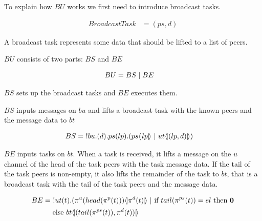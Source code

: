 To explain how $BU$ works we first need to introduce broadcast tasks.

\begin{align*}
    BroadcastTask &= (ps, d)
\end{align*}

A broadcast task represents some data that should be lifted to a list of peers.

$BU$ consists of two parts: $BS$ and $BE$

\begin{align*}
    BU &= BS \mid BE
\end{align*}

$BS$ sets up the broadcast tasks and $BE$ executes them.

$BS$ inputs messages on $bu$ and lifts a broadcast task with the known peers and the message data to $bt$

\begin{align*}
    BS &=\ !bu.(d).ps(lp).(ps \langle \! | lp | \! \rangle\ |\ ut \langle \! | (lp,d) | \! \rangle)
\end{align*}

$BE$ inputs tasks on $bt$.
When a task is received, it lifts a message on the $u$ channel of the head of the task peers with the task message data.
If the tail of the task peers is non-empty, it also lifts the remainder of the task to $bt$, that is a broadcast task with the tail of the task peers and the message data.

\begin{align*}
    BE &=\ !ut(t).(\pi^{u}(head(\pi^{p}(t)))\lift{}{\pi^{d}(t)}\ |\If{tail(\pi^{ps}(t))=el}{\nil\\
    &\quad}{bt\lift{}{(tail(\pi^{ps}(t)),\pi^{d}(t))}}
\end{align*}
